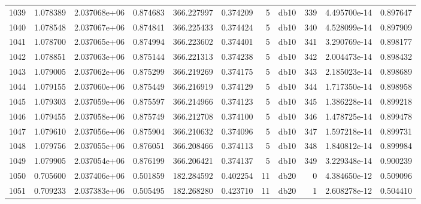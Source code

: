 \begin{tabular}{lrrrrrrlrrr}
1039 &    1.078389 &        2.037068e+06 &  0.874683 &              366.227997 &    0.374209 &       5 &         db10 &    339 &   4.495700e-14 &      0.897647 \\
1040 &    1.078548 &        2.037067e+06 &  0.874841 &              366.225433 &    0.374424 &       5 &         db10 &    340 &   4.528099e-14 &      0.897909 \\
1041 &    1.078700 &        2.037065e+06 &  0.874994 &              366.223602 &    0.374401 &       5 &         db10 &    341 &   3.290769e-14 &      0.898177 \\
1042 &    1.078851 &        2.037063e+06 &  0.875144 &              366.221313 &    0.374238 &       5 &         db10 &    342 &   2.004473e-14 &      0.898432 \\
1043 &    1.079005 &        2.037062e+06 &  0.875299 &              366.219269 &    0.374175 &       5 &         db10 &    343 &   2.185023e-14 &      0.898689 \\
1044 &    1.079155 &        2.037060e+06 &  0.875449 &              366.216919 &    0.374129 &       5 &         db10 &    344 &   1.717350e-14 &      0.898958 \\
1045 &    1.079303 &        2.037059e+06 &  0.875597 &              366.214966 &    0.374123 &       5 &         db10 &    345 &   1.386228e-14 &      0.899218 \\
1046 &    1.079455 &        2.037058e+06 &  0.875749 &              366.212708 &    0.374100 &       5 &         db10 &    346 &   1.478725e-14 &      0.899478 \\
1047 &    1.079610 &        2.037056e+06 &  0.875904 &              366.210632 &    0.374096 &       5 &         db10 &    347 &   1.597218e-14 &      0.899731 \\
1048 &    1.079756 &        2.037055e+06 &  0.876051 &              366.208466 &    0.374113 &       5 &         db10 &    348 &   1.840812e-14 &      0.899984 \\
1049 &    1.079905 &        2.037054e+06 &  0.876199 &              366.206421 &    0.374137 &       5 &         db10 &    349 &   3.229348e-14 &      0.900239 \\
1050 &    0.705600 &        2.037406e+06 &  0.501859 &              182.284592 &    0.402254 &      11 &         db20 &      0 &   4.384650e-12 &      0.509096 \\
1051 &    0.709233 &        2.037383e+06 &  0.505495 &              182.268280 &    0.423710 &      11 &         db20 &      1 &   2.608278e-12 &      0.504410 \\

\end{tabular}
